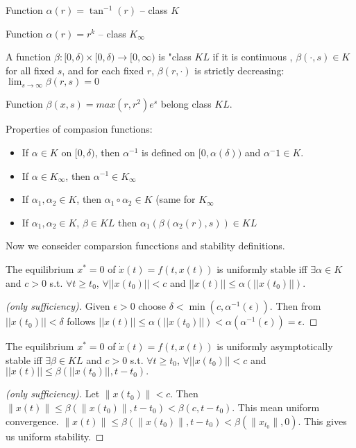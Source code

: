 \begin{Example}
 Function $\alpha(r)=\tan^{-1}(r)$ -- class $K$

 Function $\alpha(r)=r^k$ -- class $K_\infty$
\end{Example}

\begin{Definition}
 A function $\beta:[0,\delta)\times[0,\delta)\to [0, \infty)$ is "class $KL$ if it is continuous
 , $\beta(\cdot, s) \in K$ for all fixed $s$, and for each fixed $r$, $\beta(r, \cdot)$ is
 strictly decreasing: $\lim_{s\to\infty}\beta(r,s)=0$
\end{Definition}

\begin{Example}
 Function $\beta(x,s)=max(r,r^2)e^{s}$ belong class $KL$.
\end{Example}

Properties of compasion functions:

\begin{itemize}
 \item If $\alpha \in K$ on $[0, \delta)$, then $\alpha^{-1}$ is defined on 
 $[0, \alpha(\delta))$ and $\alpha^-1 \in K$.
 \item If $\alpha \in K_\infty$, then $\alpha^{-1}\in K_\infty$
 \item If $\alpha_1,\alpha_2\in K$, then $\alpha_1 \circ \alpha_2\in K$
  (same for $K_\infty$
 \item If $\alpha_1,\alpha_2\in K$, $\beta\in KL $ then 
  $\alpha_1(\beta(\alpha_2(r),s)) \in KL$
\end{itemize}

Now we conseider comparsion funcctions and stability definitions.

\begin{Lemma}
 The equilibrium $x^*=0$ of $\dot x(t)=f(t,x(t))$ is uniformly stable iff
 $\exists \alpha\in K$ and $c>0$ s.t.  $\forall t \ge t_0$,
 $\forall ||x(t_0)||<c$ and $||x(t)|| \le \alpha(||x(t_0)||).$ 

 
 \begin{proof}[(only sufficiency)]
  Given $\epsilon>0$ choose 
 $\delta<\min(c, \alpha^{-1}(\epsilon))$. Then from $||x(t_0)||<\delta$
 follows $||x(t)||\le\alpha(||x(t_0)||)<\alpha(\alpha^{-1}(\epsilon))=\epsilon$.
 \end{proof}
\end{Lemma}


\begin{Lemma}
 The equilibrium $x^*=0$ of $\dot x(t)=f(t,x(t))$ is uniformly asymptotically stable iff
 $\exists \beta\in KL$ and $c>0$ s.t. $\forall t \ge t_0$,
 $\forall ||x(t_0)||<c$ and $||x(t)|| \le \beta(||x(t_0)||, t-t_0).$ 

 \begin{proof}[(only sufficiency)] Let $\|x(t_0)\|<c$. Then 
 $\|x(t)\| \le \beta(\|x(t_0)\|, t-t_0) < \beta(c,t-t_0)$. This mean uniform convergence.
 $\|x(t)\| \le \beta(\|x(t_0)\|, t-t_0)<\beta(\|x_{t_0}\|, 0)$. This gives us uniform
 stability.
 \end{proof}
\end{Lemma}


